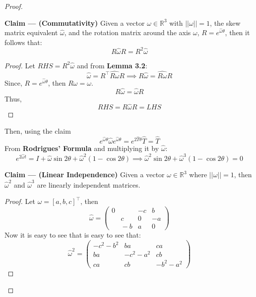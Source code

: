 \documentclass{article}
\begin{document}
\begin{proof}
        \begin{tcolorbox}[enhanced,breakable,sharp corners, colback=green!5!white, colframe=green!55!black, boxrule=0mm,top=0mm,bottom=0mm,leftrule=1mm]
        {\color{green!55!black} \textbf{Claim --- (Commutativity)}}
            Given a vector $\omega \in \mathbb{R}^3$ with $||\omega || = 1$, the skew matrix equivalent $\hat{\omega}$, and the rotation matrix around the axis $\omega $, $R = e^{\hat{\omega} \theta}$, then it follows that:
            $$R\hat{\omega} R = R^2 \hat{\omega}$$
        \end{tcolorbox}
        \begin{proof}
            Let $RHS =R^2\hat{\omega}$ and from \textbf{Lemma 3.2}: 
            $$\hat{\omega}=R^\top\widehat{R\omega}R \implies R \hat{\omega}=\widehat{R\omega}R$$
            Since, $R=e^{\hat{\omega}\theta}$, then $R\omega=\omega$.
            $$R\hat{\omega}=\hat{\omega}R$$
            Thus,
            $$RHS=R \hat{\omega}R = LHS$$
        \end{proof}
        Then, using the claim 
        $$e^{\hat{\omega}\theta}\hat{\omega} e^{\hat{\omega}\theta} = e^{2\hat{T}\theta} \hat{T}=\hat{T}$$
        From \textbf{Rodrigues’ Formula} and multiplying it by $\hat{\omega}$:
        $$e^{2\hat{\omega}t} = I + \hat{\omega}\sin{2\theta} + \hat{\omega}^2(1-\cos{2\theta}) \implies \hat{\omega}^2\sin{2\theta} + \hat{\omega}^3(1-\cos{2\theta}) = 0$$
        \begin{tcolorbox}[enhanced,breakable,sharp corners, colback=green!5!white, colframe=green!55!black, boxrule=0mm,top=0mm,bottom=0mm,leftrule=1mm]
        {\color{green!55!black} \textbf{Claim --- (Linear Independence)}}
            Given a vector $\omega \in \mathbb{R}^3$ where $||\omega || = 1$, then $\hat{\omega}^2$ and $\hat{\omega}^3$ are linearly independent matrices.
        \end{tcolorbox}
    \begin{proof}
        Let $\omega = [a, b, c]^\top$, then
        $$\hat{\omega} = \begin{pmatrix}0&-c&b\\ \:\:\:\:\:\:c&0&-a\\ \:\:\:\:\:\:-b&a&0\end{pmatrix}$$
        Now it is easy to see that is easy to see that:
        $$\hat{\omega}^2 
        = \begin{pmatrix}-c^2-b^2&ba&ca\\ ba&-c^2-a^2&cb\\ ca&cb&-b^2-a^2\end{pmatrix}
$$
\end{proof}
\end{proof}
\end{document}
